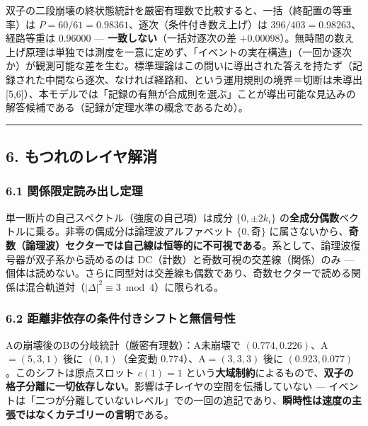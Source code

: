 \documentclass[
]{ltjsarticle}
\begin{document}
双子の二段崩壊の終状態統計を厳密有理数で比較すると、一括（終配置の等重率）は
\(P=60/61=0.98361\)、逐次（条件付き数え上げ）は
\(396/403=0.98263\)、経路等重は \(0.96000\) ---
\textbf{一致しない}（一括対逐次の差
\(+0.00098\)）。無時間の数え上げ原理は単独では測度を一意に定めず、「イベントの実在構造」（一回か逐次か）が観測可能な差を生む。標準理論はこの問いに導出された答えを持たず（記録された中間なら逐次、なければ経路和、という運用規則の境界＝切断は未導出
{[}5,6{]}）、本モデルでは「記録の有無が合成則を選ぶ」ことが導出可能な見込みの解答候補である（記録が定理水準の概念であるため）。

\begin{center}\rule{0.5\linewidth}{0.5pt}\end{center}

\subsection{6.
もつれのレイヤ解消}\label{ux3082ux3064ux308cux306eux30ecux30a4ux30e4ux89e3ux6d88}

\subsubsection{6.1
関係限定読み出し定理}\label{ux95a2ux4fc2ux9650ux5b9aux8aadux307fux51faux3057ux5b9aux7406}

単一断片の自己スペクトル（強度の自己項）は成分 \(\{0,\pm2k_i\}\)
の\textbf{全成分偶数}ベクトルに乗る。非零の偶成分は論理波アルファベット
\(\{0,奇\}\)
に属さないから、\textbf{奇数（論理波）セクターでは自己線は恒等的に不可視である}。系として、論理波復号器が双子系から読めるのは
DC（計数）と奇数可視の交差線（関係）のみ ---
個体は読めない。さらに同型対は交差線も偶数であり、奇数セクターで読める関係は混合軌道対（\(|\Delta|^2\equiv3\bmod4\)）に限られる。

\subsubsection{6.2
距離非依存の条件付きシフトと無信号性}\label{ux8dddux96e2ux975eux4f9dux5b58ux306eux6761ux4ef6ux4ed8ux304dux30b7ux30d5ux30c8ux3068ux7121ux4fe1ux53f7ux6027}

Aの崩壊後のBの分岐統計（厳密有理数）：A未崩壊で
\((0.774,0.226)\)、A\(=(5,3,1)\) 後に \((0,1)\)（全変動
0.774）、A\(=(3,3,3)\) 後に \((0.923,0.077)\)。このシフトは原点スロット
\(c(1)=1\)
という\textbf{大域制約}によるもので、\textbf{双子の格子分離に一切依存しない}。影響は子レイヤの空間を伝播していない
---
イベントは「二つが分離していないレベル」での一回の追記であり、\textbf{瞬時性は速度の主張ではなくカテゴリーの言明}である。
\end{document}
